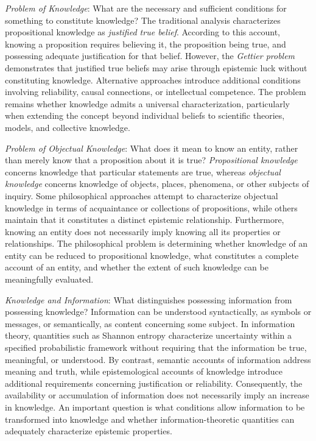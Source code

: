 \emph{Problem of Knowledge}: What are the necessary and sufficient conditions for something to constitute knowledge? The traditional analysis characterizes propositional knowledge as \emph{justified true belief}. According to this account, knowing a proposition requires believing it, the proposition being true, and possessing adequate justification for that belief. However, the \emph{Gettier problem} demonstrates that justified true beliefs may arise through epistemic luck without constituting knowledge. Alternative approaches introduce additional conditions involving reliability, causal connections, or intellectual competence. The problem remains whether knowledge admits a universal characterization, particularly when extending the concept beyond individual beliefs to scientific theories, models, and collective knowledge.

\emph{Problem of Objectual Knowledge}: What does it mean to know an entity, rather than merely know that a proposition about it is true? \emph{Propositional knowledge} concerns knowledge that particular statements are true, whereas \emph{objectual knowledge} concerns knowledge of objects, places, phenomena, or other subjects of inquiry. Some philosophical approaches attempt to characterize objectual knowledge in terms of acquaintance or collections of propositions, while others maintain that it constitutes a distinct epistemic relationship. Furthermore, knowing an entity does not necessarily imply knowing all its properties or relationships. The philosophical problem is determining whether knowledge of an entity can be reduced to propositional knowledge, what constitutes a complete account of an entity, and whether the extent of such knowledge can be meaningfully evaluated.

\emph{Knowledge and Information}: What distinguishes possessing information from possessing knowledge? Information can be understood syntactically, as symbols or messages, or semantically, as content concerning some subject. In information theory, quantities such as Shannon entropy characterize uncertainty within a specified probabilistic framework without requiring that the information be true, meaningful, or understood. By contrast, semantic accounts of information address meaning and truth, while epistemological accounts of knowledge introduce additional requirements concerning justification or reliability. Consequently, the availability or accumulation of information does not necessarily imply an increase in knowledge. An important question is what conditions allow information to be transformed into knowledge and whether information-theoretic quantities can adequately characterize epistemic properties.

